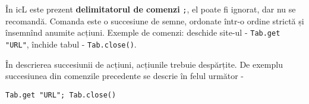 \begin{sourcecode}
    \label{unreadable}
    \inputminted[linenos]{icl}{../sources/unreadable.icL}
\end{sourcecode}

În icL este prezent \textbf{delimitatorul de comenzi} \texttt{;}, el poate fi ignorat, dar nu se recomandă. Comanda este o succesiune de semne, ordonate într-o ordine strictă și însemnînd anumite acțiuni. Exemple de comenzi: deschide site-ul - \texttt{Tab.get "URL"}, închide tabul - \texttt{Tab.close()}.

În descrierea succesiunii de acțiuni, acțiunile trebuie despărțite. De exemplu succesiunea din comenzile precedente se descrie în felul următor -
\begin{verbatim}
Tab.get "URL"; Tab.close()
\end{verbatim}

\begin{sourcecode}
    \label{readable}
    \inputminted[linenos]{icl}{../sources/readable.icL}
\end{sourcecode}
